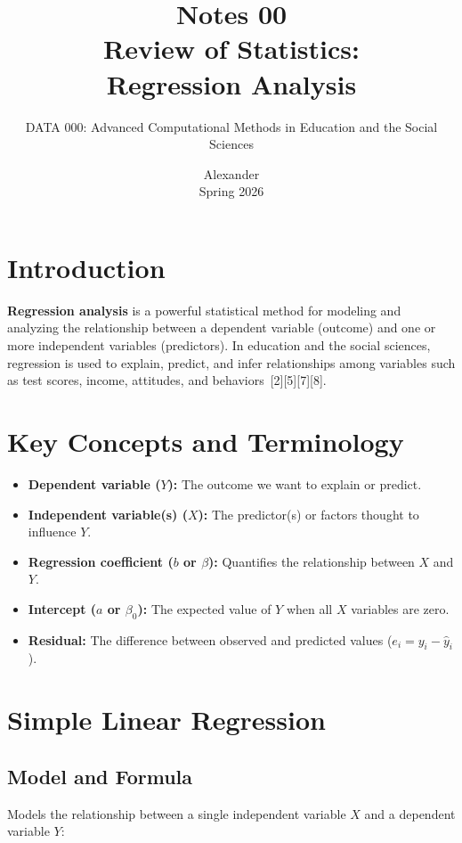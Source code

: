 \documentclass[11pt]{article}
\title{Notes 00 \\ Review of Statistics: \\ Regression Analysis}
\author{DATA 000: Advanced Computational Methods in Education and the Social Sciences}
\date{Alexander \\ Spring 2026}
\begin{document}
\maketitle

\tableofcontents

\section{Introduction}

\textbf{Regression analysis} is a powerful statistical method for modeling and analyzing the relationship between a dependent variable (outcome) and one or more independent variables (predictors). In education and the social sciences, regression is used to explain, predict, and infer relationships among variables such as test scores, income, attitudes, and behaviors\ [2][5][7][8].

\section{Key Concepts and Terminology}

\begin{itemize}
    \item \textbf{Dependent variable ($Y$):} The outcome we want to explain or predict.
    \item \textbf{Independent variable(s) ($X$):} The predictor(s) or factors thought to influence $Y$.
    \item \textbf{Regression coefficient ($b$ or $\beta$):} Quantifies the relationship between $X$ and $Y$.
    \item \textbf{Intercept ($a$ or $\beta_0$):} The expected value of $Y$ when all $X$ variables are zero.
    \item \textbf{Residual:} The difference between observed and predicted values ($e_i = y_i - \hat{y}_i$).
\end{itemize}

\section{Simple Linear Regression}

\subsection{Model and Formula}

Models the relationship between a single independent variable $X$ and a dependent variable $Y$:
\end{document}
